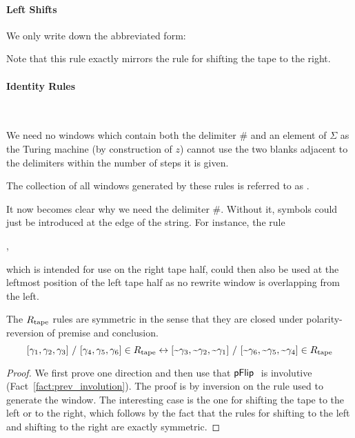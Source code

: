 \paragraph{Left Shifts}
We only write down the abbreviated form:
\begin{center}
\end{center}
Note that this rule exactly mirrors the rule for shifting the tape to the right.

\paragraph{Identity Rules}
\begin{center}
  \\
  \trewwin{\#}{\blank}{\blank}{\#}{\blank}{\blank} 
  \quad \trewwin{\blank}{\blank}{\#}{\blank}{\blank}{\#}
\end{center}
We need no windows which contain both the delimiter $\#$ and an element of $\Sigma$ as the Turing machine (by construction of $z$) cannot use the two blanks adjacent to the delimiters within the number of steps it is given.

The collection of all windows generated by these rules is referred to as \mnotec[tapeRules]{$\Rtape$}.

\begin{remark}
  It now becomes clear why we need the delimiter $\#$. Without it, symbols could just be introduced at the edge of the string. For instance, the rule 
  \begin{center}
    ,
  \end{center}
  which is intended for use on the right tape half, could then also be used at the leftmost position of the left tape half as no rewrite window is overlapping from the left.
\end{remark}

\begin{lemma}\label{lem:symm_rtape}
  The $\Rtape$ rules are symmetric in the sense that they are closed under polarity-reversion of premise and conclusion.
  \[[\gamma_1, \gamma_2, \gamma_3]~/~[\gamma_4, \gamma_5, \gamma_6] \in R_{\text{tape}} \leftrightarrow [\text{\textasciitilde}\gamma_3, \text{\textasciitilde}\gamma_2, \text{\textasciitilde}\gamma_1]~/~[\text{\textasciitilde}\gamma_6, \text{\textasciitilde}\gamma_5, \text{\textasciitilde}\gamma_4] \in R_{\text{tape}} \]
\end{lemma}
\begin{proof}
  We first prove one direction and then use that $\pFlip$ is involutive (Fact~\ref{fact:prev_involution}).
  The proof is by inversion on the rule used to generate the window. The interesting case is the one for shifting the tape to the left or to the right, which follows by the fact that the rules for shifting to the left and shifting to the right are exactly symmetric. 
\end{proof}

